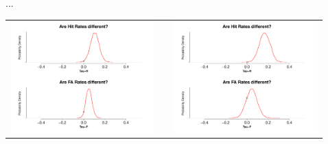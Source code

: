 \documentclass[final]{beamer}
\newlength{\sepwid}
\newlength{\onecolwid}
\newlength{\twocolwid}
\begin{document}
\begin{frame}[t]
\begin{columns}[t]
\begin{column}{\twocolwid}
\begin{columns}[t,totalwidth=\twocolwid] %

\begin{column}{\onecolwid} %


\end{column} %

\end{columns} %

\end{column} %

\begin{column}{\sepwid}\end{column} %

\begin{column}{\onecolwid} %

\begin{alertblock}{...}

\begin{center}
\begin{tabular}{ccc}
\includegraphics[width=0.45\linewidth]{Figures/Tau_1.pdf} & \hfill & \includegraphics[width=0.45\linewidth]{Figures/Tau_2.pdf}
\end{tabular}
\end{center}


\end{alertblock}
\end{column}
\end{columns}
\end{frame}
\end{document}
